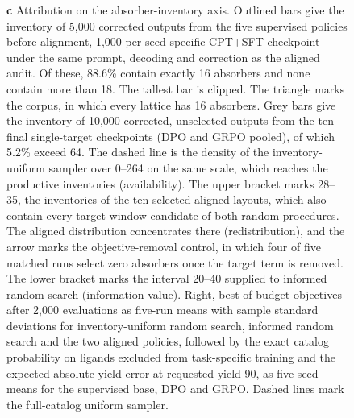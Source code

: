 \begin{figure}[H]
{\textbf{c} Attribution on the absorber-inventory axis. Outlined bars give the inventory of 5{,}000 corrected outputs from the five supervised policies before alignment, 1{,}000 per seed-specific CPT$+$SFT checkpoint under the same prompt, decoding and correction as the aligned audit. Of these, 88.6\% contain exactly 16 absorbers and none contain more than 18. The tallest bar is clipped. The triangle marks the corpus, in which every lattice has 16 absorbers. Grey bars give the inventory of 10{,}000 corrected, unselected outputs from the ten final single-target checkpoints (DPO and GRPO pooled), of which 5.2\% exceed 64. The dashed line is the density of the inventory-uniform sampler over 0--264 on the same scale, which reaches the productive inventories (availability). The upper bracket marks 28--35, the inventories of the ten selected aligned layouts, which also contain every target-window candidate of both random procedures. The aligned distribution concentrates there (redistribution), and the arrow marks the objective-removal control, in which four of five matched runs select zero absorbers once the target term is removed. The lower bracket marks the interval 20--40 supplied to informed random search (information value). Right, best-of-budget objectives after 2{,}000 evaluations as five-run means with sample standard deviations for inventory-uniform random search, informed random search and the two aligned policies, followed by the exact catalog probability on ligands excluded from task-specific training and the expected absolute yield error at requested yield 90, as five-seed means for the supervised base, DPO and GRPO. Dashed lines mark the full-catalog uniform sampler.}
\label{fig:concept}
\end{figure}
